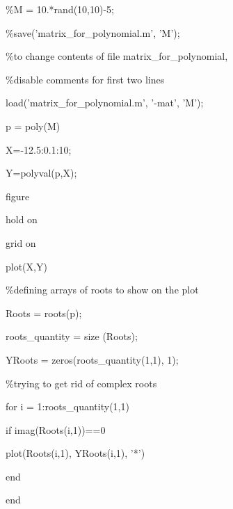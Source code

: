 \documentclass[a4paper,12pt]{article}
\begin{document}
{\color{green}
\%M = 10.*rand(10,10)-5;\par
\%save('matrix\_for\_polynomial.m', 'M');\par
\%to change contents of file matrix\_for\_polynomial,\par
\%disable comments for first two lines\par}
load('matrix\_for\_polynomial.m', '-mat', 'M');\par
p = poly(M)\par
X=-12.5:0.1:10;\par
Y=polyval(p,X);\par
figure\par
hold on\par
grid on\par
plot(X,Y)\par
{\color{green}
\%defining arrays of roots to show on the plot}\par
Roots = roots(p);\par
roots\_quantity = size (Roots);\par
YRoots = zeros(roots\_quantity(1,1), 1);\par
{\color{green}
\%trying to get rid of complex roots}\par
for i = 1:roots\_quantity(1,1)\par
\hspace{10pt} if imag(Roots(i,1))==0\par
\hspace{10pt}\hspace{10pt} plot(Roots(i,1), YRoots(i,1), '*')\par
\hspace{10pt} end\par
end\par
\end{document}
